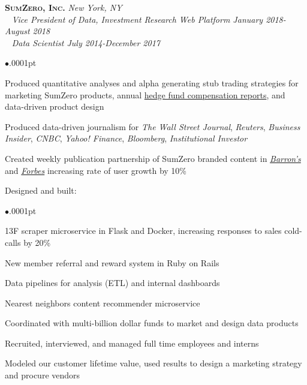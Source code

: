 \documentclass[11pt]{article}
\newcommand{\employer}[4]{
	{\hspace*{-20pt} {\small{\textbf{\textsc{ #1}}}}
  \hfill \small{\emph{#2}}\\ ~\hspace*{-20pt} \small \emph{ #3 \hfill #4}}\\ }
\newcommand{\position}[2]
	{ ~\hspace*{-20pt} \small \emph{ #1 \hfill #2}}
\newenvironment{achievements}{\begin{list}{$\bullet$}{\topsep .0001pt \itemsep -2pt}}{\vspace*{5pt}\end{list} }
\begin{document}
\employer{SumZero, Inc.}{New York, NY}{Vice President of Data, Investment Research Web Platform}{January 2018-August 2018}
\position{Data Scientist}{July 2014-December 2017}
	\begin{achievements}
		\item Produced quantitative analyses and alpha generating stub trading strategies for marketing SumZero products, annual \href{https://sumzero.com/sp/szcomp2017}{hedge fund compensation reports}, and data-driven product design 
		\item Produced data-driven journalism for \emph{The Wall Street Journal}, \emph{Reuters}, \emph{Business Insider}, \emph{CNBC}, \emph{Yahoo! Finance}, \emph{Bloomberg}, \emph{Institutional Investor}
		\item Created weekly publication partnership of SumZero branded content in \href{http://www.barrons.com/search?keyword=view+from+the+buyside+sumzero&numResults=15&sort=date-desc&author=&searchWindow=0&minDate=&maxDate=&source=barrons}{\emph{Barron's}} and \href{https://www.forbes.com/sites/lukeschiefelbein/#7442bc65216e}{\emph{Forbes}} increasing rate of user growth by 10\%
		\item Designed and built:
		\begin{achievements}
		\item 13F scraper microservice in Flask and Docker, increasing responses to sales cold-calls by 20\%
		\item New member referral and reward system in Ruby on Rails
		\item Data pipelines for analysis (ETL) and internal dashboards
		\item Nearest neighbors content recommender microservice
		\end{achievements}
		\item Coordinated with multi-billion dollar funds to market and design data products
		\item Recruited, interviewed, and managed full time employees and interns
		\item Modeled our customer lifetime value, used results to design a marketing strategy and procure vendors
	\end{achievements}
\end{document}

